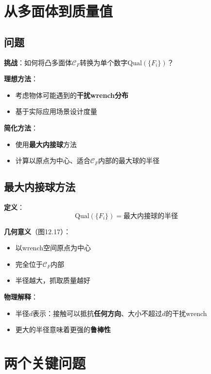 \documentclass[12pt,a4paper]{article}
\begin{document}
\section{从多面体到质量值}

\subsection{问题}

\textbf{挑战}：如何将凸多面体$\mathcal{C}_F$转换为单个数字$\text{Qual}(\{F_i\})$？

\textbf{理想方法}：
\begin{itemize}
\item 考虑物体可能遇到的\textbf{干扰wrench分布}
\item 基于实际应用场景设计度量
\end{itemize}

\textbf{简化方法}：
\begin{itemize}
\item 使用\textbf{最大内接球}方法
\item 计算以原点为中心、适合$\mathcal{C}_F$内部的最大球的半径
\end{itemize}

\subsection{最大内接球方法}

\textbf{定义}：
\begin{equation}
\text{Qual}(\{F_i\}) = \text{最大内接球的半径}
\end{equation}

\textbf{几何意义}（图12.17）：
\begin{itemize}
\item 以wrench空间原点为中心
\item 完全位于$\mathcal{C}_F$内部
\item 半径越大，抓取质量越好
\end{itemize}

\textbf{物理解释}：
\begin{itemize}
\item 半径$d$表示：接触可以抵抗\textbf{任何方向}、大小不超过$d$的干扰wrench
\item 更大的半径意味着更强的\textbf{鲁棒性}
\end{itemize}

\section{两个关键问题}
\end{document}
